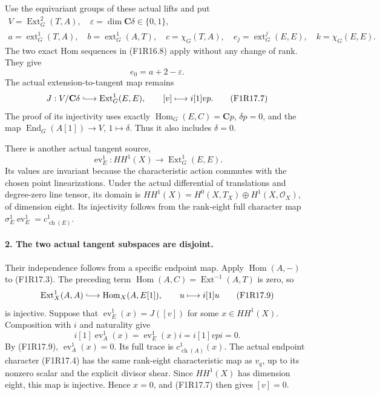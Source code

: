 Use the equivariant groups of these actual lifts and put
\[
 \begin{gathered}
 V=\operatorname{Ext}^2_G(T,A),\quad
 \varepsilon=\dim\mathbf C\delta\in\{0,1\},\\
 a=\operatorname{ext}^1_G(T,A),\quad
 b=\operatorname{ext}^1_G(A,T),\quad
 c=\chi_G(T,A),\quad
 e_j=\operatorname{ext}^j_G(E,E),\quad k=\chi_G(E,E).
 \end{gathered}
 \tag{F1R17.5}
\]
The two exact Hom sequences in (F1R16.8) apply without
any change of rank. They give
\[
                       e_0=a+2-\varepsilon.
 \tag{F1R17.6}
\]
The actual extension-to-tangent map remains
\[
 J:V/\mathbf C\delta\lhook\joinrel\longrightarrow
             \operatorname{Ext}^1_G(E,E),
                    \qquad [v]\longmapsto i[1]vp.
 \tag{F1R17.7}
\]
The proof of its injectivity uses exactly
$\operatorname{Hom}_G(E,C)=\mathbf C p$, $\delta p=0$,
and the map
$\operatorname{End}_G(A[1])\to V$, $1\mapsto\delta$.
Thus it also includes $\delta=0$.

There is another actual tangent source,
\[
  \operatorname{ev}_E^1:HH^1(X)\longrightarrow
                               \operatorname{Ext}^1_G(E,E).
 \tag{F1R17.8}
\]
Its values are invariant because the characteristic
action commutes with the chosen point linearizations.
Under the actual differential of translations and
degree-zero line tensor, its domain is
$HH^1(X)=H^0(X,T_X)\oplus H^1(X,\mathcal O_X)$,
of dimension eight. Its injectivity follows from
the rank-eight full character map
$\sigma_E^1\operatorname{ev}_E^1=c^1_{\operatorname{ch}(E)}$.

\paragraph{2. The two actual tangent subspaces are disjoint.}
Their independence follows from a specific endpoint map.
Apply $\operatorname{Hom}(A,-)$ to (F1R17.3). The preceding
term $\operatorname{Hom}(A,C)=\operatorname{Ext}^{-1}(A,T)$
is zero, so
\[
 \operatorname{Ext}^1_X(A,A)\lhook\joinrel\longrightarrow
       \operatorname{Hom}_X(A,E[1]),
                      \qquad u\longmapsto i[1]u
 \tag{F1R17.9}
\]
is injective. Suppose that
$\operatorname{ev}_E^1(x)=J([v])$ for some
$x\in HH^1(X)$. Composition with $i$ and naturality give
\[
 i[1]\operatorname{ev}_A^1(x)
       =\operatorname{ev}_E^1(x)i
       =i[1]vpi=0.
 \tag{F1R17.10}
\]
By (F1R17.9), $\operatorname{ev}_A^1(x)=0$. Its full
trace is $c^1_{\operatorname{ch}(A)}(x)$. The actual
endpoint character (F1R17.4) has the same rank-eight
characteristic map as $v_q$, up to its nonzero scalar
and the explicit divisor shear. Since $HH^1(X)$ has
dimension eight, this map is injective. Hence $x=0$,
and (F1R17.7) then gives $[v]=0$.

